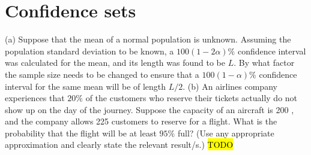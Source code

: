 
\chapter{Confidence sets\label{chap:confidenceSets}}

\begin{example}
	\label{exa:isi2009samplepsb10}
	(a) Suppose that the mean of a normal population is unknown. Assuming the population standard deviation to be known, a $100(1-2 \alpha) \%$ confidence interval was calculated for the mean, and its length was found to be $L$. By what factor the sample size needs to be changed to ensure that a $100(1-\alpha) \%$ confidence interval for the same mean will be of length $L / 2$.
	(b) An airlines company experiences that $20 \%$ of the customers who reserve their tickets actually do not show up on the day of the journey. Suppose the capacity of an aircraft is 200 , and the company allows 225 customers to reserve for a flight. What is the probability that the flight will be at least $95 \%$ full? (Use any appropriate approximation and clearly state the relevant result/s.)
	\hl{TODO}
\end{example}